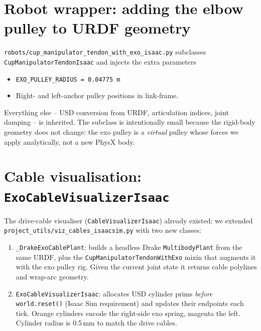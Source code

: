 \documentclass[11pt,a4paper]{article}
\begin{document}
\section{Robot wrapper: adding the elbow pulley to URDF geometry}

\texttt{robots/cup\_manipulator\_tendon\_with\_exo\_isaac.py} subclasses
\texttt{CupManipulatorTendonIsaac} and injects the extra parameters
\begin{itemize}
    \item \texttt{EXO\_PULLEY\_RADIUS = 0.04775\,m}
    \item Right- and left-anchor pulley positions in link-frame.
\end{itemize}
Everything else -- USD conversion from URDF, articulation indices,
joint damping -- is inherited.  The subclass is intentionally small
because the rigid-body geometry does not change: the exo pulley is a
\emph{virtual} pulley whose forces we apply analytically, not a new
PhysX body.

\section{Cable visualisation: \texttt{ExoCableVisualizerIsaac}}

The drive-cable visualiser (\texttt{CableVisualizerIsaac}) already
existed; we extended \texttt{project\_utils/viz\_cables\_isaacsim.py}
with two new classes:

\begin{enumerate}
    \item \texttt{\_DrakeExoCablePlant}: builds a headless Drake
          \texttt{MultibodyPlant} from the same URDF, plus the
          \texttt{CupManipulatorTendonWithExo} mixin that augments it
          with the exo pulley rig.  Given the current joint state it
          returns cable polylines and wrap-arc geometry.
    \item \texttt{ExoCableVisualizerIsaac}: allocates USD cylinder
          prims \emph{before} \texttt{world.reset()} (Isaac Sim
          requirement) and updates their endpoints each tick.  Orange
          cylinders encode the right-side exo spring, magenta the
          left.  Cylinder radius is 0.5\,mm to match the drive cables.
\end{enumerate}
\end{document}
